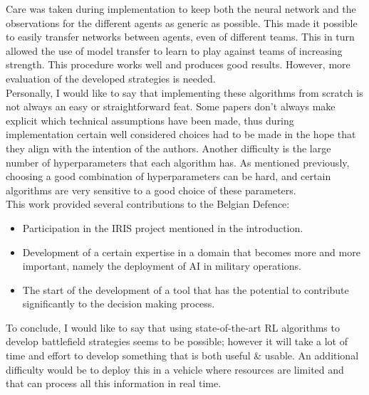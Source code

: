 Care was taken during implementation to keep both the neural network and the observations for the different agents as generic as possible. This made it possible to easily transfer networks between agents, even of different teams. This in turn allowed the use of model transfer to learn to play against teams of increasing strength. This procedure works well and produces good results. However, more evaluation of the developed strategies is needed.\\
Personally, I would like to say that implementing these algorithms from scratch is not always an easy or straightforward feat. Some papers don't always make explicit which technical assumptions have been made, thus during implementation certain well considered choices had to be made in the hope that they align with the intention of the authors. Another difficulty is the large number of hyperparameters that each algorithm has. As mentioned previously, choosing a good combination of hyperparameters can be hard, and certain algorithms are very sensitive to a good choice of these parameters.\\
This work provided several contributions to the Belgian Defence:
\begin{itemize}
    \item Participation in the IRIS project mentioned in the introduction.
    \item Development of a certain expertise in a domain that becomes more and more important, namely the deployment of AI in military operations.
    \item The start of the development of a tool that has the potential to contribute significantly to the decision making process.
\end{itemize}
To conclude, I would like to say that using state-of-the-art RL algorithms to develop battlefield strategies seems to be possible; however it will take a lot of time and effort to develop something that is both useful \& usable. An additional difficulty would be to deploy this in a vehicle where resources are limited and that can process all this information in real time.